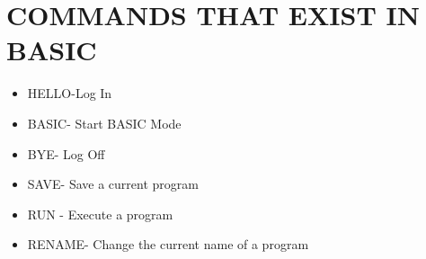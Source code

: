 \documentclass{article}
\begin{document}
	\section*{COMMANDS THAT EXIST IN BASIC}
	\begin{itemize}
			\item{HELLO-Log In}
	         \item{BASIC- Start BASIC Mode}
	         \item{BYE- Log Off}
	         \item{SAVE- Save a current program}
	         \item{RUN - Execute a program}
	         \item{RENAME- Change the current name of a program}
		\end{itemize}
	
\end{document}

